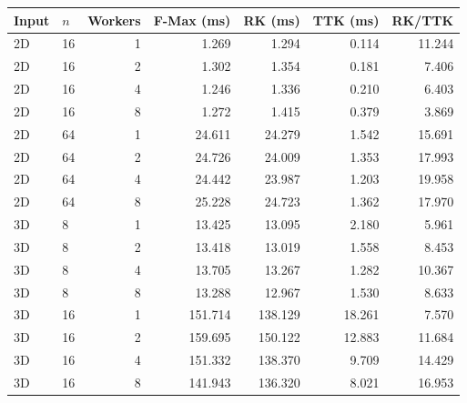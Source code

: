 \begin{tabular}{llrrrrr}
\hline
Input & $n$ & Workers & F-Max (ms) & RK (ms) & TTK (ms) & RK/TTK \\
\hline
2D & 16 & 1 & 1.269 & 1.294 & 0.114 & 11.244 \\
2D & 16 & 2 & 1.302 & 1.354 & 0.181 & 7.406 \\
2D & 16 & 4 & 1.246 & 1.336 & 0.210 & 6.403 \\
2D & 16 & 8 & 1.272 & 1.415 & 0.379 & 3.869 \\
2D & 64 & 1 & 24.611 & 24.279 & 1.542 & 15.691 \\
2D & 64 & 2 & 24.726 & 24.009 & 1.353 & 17.993 \\
2D & 64 & 4 & 24.442 & 23.987 & 1.203 & 19.958 \\
2D & 64 & 8 & 25.228 & 24.723 & 1.362 & 17.970 \\
3D & 8 & 1 & 13.425 & 13.095 & 2.180 & 5.961 \\
3D & 8 & 2 & 13.418 & 13.019 & 1.558 & 8.453 \\
3D & 8 & 4 & 13.705 & 13.267 & 1.282 & 10.367 \\
3D & 8 & 8 & 13.288 & 12.967 & 1.530 & 8.633 \\
3D & 16 & 1 & 151.714 & 138.129 & 18.261 & 7.570 \\
3D & 16 & 2 & 159.695 & 150.122 & 12.883 & 11.684 \\
3D & 16 & 4 & 151.332 & 138.370 & 9.709 & 14.429 \\
3D & 16 & 8 & 141.943 & 136.320 & 8.021 & 16.953 \\
\hline
\end{tabular}
